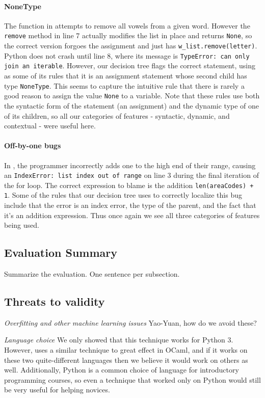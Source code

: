 \documentclass[conference]{IEEEtran}
\newcommand\lt[1]{{\lstinline|#1|}}
\begin{document}
\paragraph{NoneType}
The function in  attempts to remove all vowels from a
given word. However the
\lt{remove} method in line 7 actually modifies the list in place and returns
\lt{None}, so the correct version forgoes the assignment and just has
\lt{w_list.remove(letter)}. Python does not crash until line 8, where its
message is \lt{TypeError: can only join an iterable}. However, our decision
tree flags the correct statement, using as some of its rules that it is an
assignment statement whose second child has type \lt{NoneType}. This seems to
capture the intuitive rule that there is rarely a good reason to assign the
value \lt{None} to a variable. Note that these rules use both the syntactic
form of the statement (an assignment) and the dynamic type of one of its
children, so all our categories of features - syntactic, dynamic, and
contextual - were useful here.

\paragraph{Off-by-one bugs}
In , the programmer incorrectly adds one to the high
end of their range, causing an \lt{IndexError: list index out of range} on line
3 during the final iteration of the for loop. The correct expression to blame
is the addition \lt{len(areaCodes) + 1}. Some of the rules that our
decision tree uses to correctly localize this bug include that the error is an
index error, the type of the parent, and the fact that it's an addition
expression. Thus once again we see all three categories of features being used.

\subsection{Evaluation Summary}

Summarize the evaluation. One sentence per subsection.

\subsection{Threats to validity}
\label{sec-threats}

\emph{Overfitting and other machine learning issues} Yao-Yuan, how do we avoid
these?

\emph{Language choice} We only showed that this technique works for Python 3.
However, \cite{learning-to-blame} uses a similar technique to great effect in
OCaml, and if it works on these two quite-different languages then we believe
it would work on others as well. Additionally, Python is a common choice of
language for introductory programming courses, so even a technique that worked
only on Python would still be very useful for helping novices.
\end{document}
